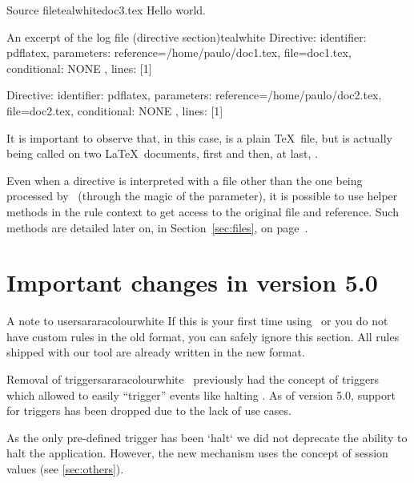 \begin{ncodebox}{Source file}{teal}{\icnote}{white}{doc3.tex}
Hello world.
\bye
\end{ncodebox}

\begin{codebox}{An excerpt of the log file (directive section)}{teal}{\icnote}{white}
Directive: { identifier: pdflatex, parameters:
{reference=/home/paulo/doc1.tex, file=doc1.tex},
conditional: { NONE }, lines: [1] }

Directive: { identifier: pdflatex, parameters:
{reference=/home/paulo/doc2.tex, file=doc2.tex},
conditional: { NONE }, lines: [1] }
\end{codebox}

It is important to observe that, in this case,  is a plain \TeX\ file, but  is actually being called on two \LaTeX\ documents, first  and then, at last, .

Even when a directive is interpreted with a file other than the one being processed by \arara\ (through the magic of the  parameter), it is possible to use helper methods in the rule context to get access to the original file and reference. Such methods are detailed later on, in Section~\ref{sec:files}, on page~\pageref{sec:files}.

\section{Important changes in version 5.0}
\label{sec:migrationguide}

\begin{messagebox}{A note to users}{araracolour}{\icattention}{white}
If this is your first time using \arara\ or you do not have custom rules in the old format, you can safely ignore this section. All rules shipped with our tool are already written in the new format.
\end{messagebox}

\begin{messagebox}{Removal of triggers}{araracolour}{\icattention}{white}
\arara\ previously had the concept of triggers which allowed to easily ``trigger'' events like halting \arara. As of version 5.0, support for triggers has been dropped due to the lack of use cases.

As the only pre-defined trigger has been `halt` we did not deprecate the ability to halt the application. However, the new mechanism uses the concept of session values (see \autoref{sec:others}).
\end{messagebox}

